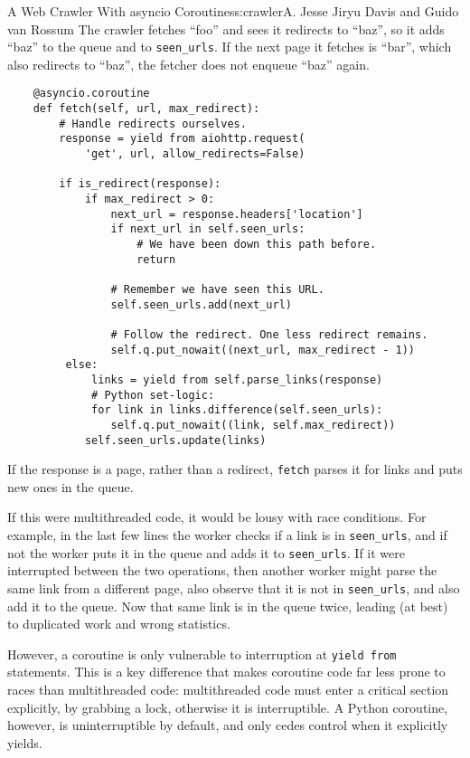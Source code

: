 \begin{aosachapter}{A Web Crawler With asyncio Coroutines}{s:crawler}{A. Jesse Jiryu Davis and Guido van Rossum}
The crawler fetches ``foo'' and sees it redirects to ``baz'', so it adds
``baz'' to the queue and to \texttt{seen\_urls}. If the next page it
fetches is ``bar'', which also redirects to ``baz'', the fetcher does
not enqueue ``baz'' again.

\begin{verbatim}
    @asyncio.coroutine
    def fetch(self, url, max_redirect):
        # Handle redirects ourselves.
        response = yield from aiohttp.request(
            'get', url, allow_redirects=False)

        if is_redirect(response):
            if max_redirect > 0:
                next_url = response.headers['location']
                if next_url in self.seen_urls:
                    # We have been down this path before.
                    return

                # Remember we have seen this URL.
                self.seen_urls.add(next_url)
                
                # Follow the redirect. One less redirect remains.
                self.q.put_nowait((next_url, max_redirect - 1))
         else:
             links = yield from self.parse_links(response)
             # Python set-logic:
             for link in links.difference(self.seen_urls):
                self.q.put_nowait((link, self.max_redirect))
            self.seen_urls.update(links)
\end{verbatim}

If the response is a page, rather than a redirect, \texttt{fetch} parses
it for links and puts new ones in the queue.

If this were multithreaded code, it would be lousy with race conditions.
For example, in the last few lines the worker checks if a link is in
\texttt{seen\_urls}, and if not the worker puts it in the queue and adds
it to \texttt{seen\_urls}. If it were interrupted between the two
operations, then another worker might parse the same link from a
different page, also observe that it is not in \texttt{seen\_urls}, and
also add it to the queue. Now that same link is in the queue twice,
leading (at best) to duplicated work and wrong statistics.

However, a coroutine is only vulnerable to interruption at
\texttt{yield from} statements. This is a key difference that makes
coroutine code far less prone to races than multithreaded code:
multithreaded code must enter a critical section explicitly, by grabbing
a lock, otherwise it is interruptible. A Python coroutine, however, is
uninterruptible by default, and only cedes control when it explicitly
yields.


\end{aosachapter}
